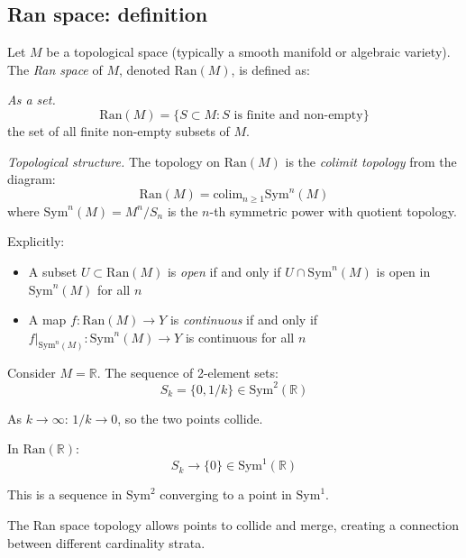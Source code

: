 \subsection{Ran space: definition}

\begin{definition}
\label{def:ran-space-complete}
Let $M$ be a topological space (typically a smooth manifold or algebraic variety). 
The \emph{Ran space} of $M$, denoted $\text{Ran}(M)$, is defined as:

\emph{As a set.}
\[\text{Ran}(M) = \{S \subset M : S \text{ is finite and non-empty}\}\]
the set of all finite non-empty subsets of $M$.

\emph{Topological structure.} The topology on $\text{Ran}(M)$ is the \emph{colimit
topology} from the diagram:
\[\text{Ran}(M) = \text{colim}_{n \geq 1} \text{Sym}^n(M)\]
where $\text{Sym}^n(M) = M^n/S_n$ is the $n$-th symmetric power with quotient topology.

Explicitly:
\begin{itemize}
\item A subset $U \subset \text{Ran}(M)$ is \emph{open} if and only if 
   $U \cap \text{Sym}^n(M)$ is open in $\text{Sym}^n(M)$ for all $n$
   
\item A map $f: \text{Ran}(M) \to Y$ is \emph{continuous} if and only if 
   $f|_{\text{Sym}^n(M)}: \text{Sym}^n(M) \to Y$ is continuous for all $n$
\end{itemize}
\end{definition}

\begin{example}
\label{ex:convergence-ran}
Consider $M = \mathbb{R}$. The sequence of 2-element sets:
\[S_k = \{0, 1/k\} \in \text{Sym}^2(\mathbb{R})\]

As $k \to \infty$: $1/k \to 0$, so the two points collide.

In $\text{Ran}(\mathbb{R})$:
\[S_k \to \{0\} \in \text{Sym}^1(\mathbb{R})\]

This is a sequence in $\text{Sym}^2$ converging to a point in $\text{Sym}^1$.

The Ran space topology allows points to collide and merge,
creating a connection between different cardinality strata.
\end{example}

